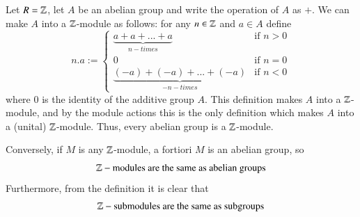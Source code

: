 \documentclass[12pt, a4paper, oneside, openright, titlepage]{book}
\begin{document}
\begin{eg}[(Z-Modules)]
    Let $R=\mathbb Z$, let $A$ be an abelian group and write the operation of $A$ as $+$. We can make $A$ into a $\mathbb Z$-module as follows: for any $n \in \mathbb Z$ and $a \in A$ define \begin{equation*}
        n.a := \left\{\begin{array}{lc} \underbrace{a+a+...+a}_{n-times} & \text{if } n > 0 \\ 0 & \text{if } n = 0 \\ \underbrace{(-a)+(-a)+...+(-a)}_{-n-times} & \text{if } n < 0
        \end{array}\right.
    \end{equation*}
    where $0$ is the identity of the additive group $A$. This definition makes $A$ into a $\mathbb Z$-module, and by the module actions this is the only definition which makes $A$ into a (unital) $\mathbb Z$-module. Thus, every abelian group is a $\mathbb Z$-module. 


    Conversely, if $M$ is any $\mathbb Z$-module, a fortiori $M$ is an abelian group, so \begin{equation*}
        \mathbb Z-\text{modules are the same as abelian groups}
    \end{equation*}
    Furthermore, from the definition it is clear that \begin{equation*}
        \mathbb Z-\text{submodules are the same as subgroups}
    \end{equation*}
\end{eg}
\end{document}
